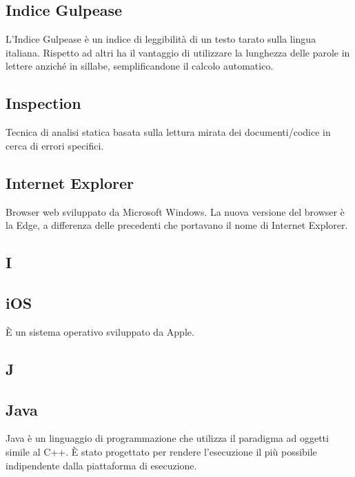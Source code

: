 \subsection{Indice Gulpease}
L'Indice Gulpease è un indice di leggibilità di un testo tarato sulla lingua
italiana. Rispetto ad altri ha il vantaggio di utilizzare la lunghezza delle parole in lettere
anziché in sillabe, semplificandone il calcolo automatico.

\subsection{Inspection }
Tecnica di analisi statica basata sulla lettura mirata dei documenti/codice in cerca di
errori specifici.

\subsection{Internet Explorer}
Browser web sviluppato da Microsoft Windows. La nuova versione del browser è la Edge, a differenza delle precedenti che portavano il nome di Internet Explorer.

\newpage

\begin{center}
\Huge\section{\uppercase{i}}
\end{center}

\subsection{iOS}
È un sistema operativo sviluppato da Apple.

\newpage

\begin{center}
\Huge\section{\uppercase{J}}
\end{center}

\subsection{Java}
Java è un linguaggio di programmazione che utilizza il paradigma ad oggetti simile al C++. È stato
progettato per rendere l'esecuzione il più possibile indipendente dalla piattaforma di
esecuzione.

